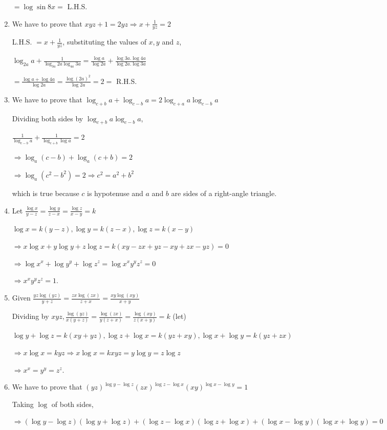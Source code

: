 \begin{enumerate}
  $= \log\sin8x =$ L.H.S.
\item We have to prove that $xyz + 1 = 2yz \Rightarrow x + \frac{1}{yz} = 2$

  L.H.S. $= x + \frac{1}{yz}$, substituting the values of $x, y$ and $z$,

  $\log_{2a}a + \frac{1}{\log_{3a}2a\log_{4a}3a} = \frac{\log a}{\log 2a} + \frac{\log 3a.\log 4a}{\log 2a.\log 3a}$

  $= \frac{\log a + \log 4a}{\log 2a} = \frac{\log(2a)^2}{\log 2a} = 2 =$ R.H.S.
\item We have to prove that $\log_{c + b}a + \log_{c - b}a = 2\log_{c + a}a\log_{c - b}a$

  Dividing both sides by $\log_{c + b}a\log_{c - b}a$,

  $\frac{1}{\log_{c - b}a} + \frac{1}{\log_{c + b}\log a} = 2$

  $\Rightarrow \log_a(c - b) + \log_a(c + b) = 2$

  $\Rightarrow \log_a(c^2 - b^2) = 2\Rightarrow c^2 = a^2 + b^2$

  which is true because $c$ is hypotenuse and $a$ and $b$ are sides of a right-angle triangle.
\item Let $\frac{\log x}{y - z} = \frac{\log y}{z - x} = \frac{\log z}{x - y} = k$

  $\log x = k(y - z), \log y = k(z - x), \log z = k(x - y)$

  $\Rightarrow x\log x + y\log y + z\log z = k(xy - zx + yz - xy + zx - yz) = 0$

  $\Rightarrow \log x^x + \log y^y + \log z^z = \log x^xy^yz^z = 0$

  $\Rightarrow x^xy^yz^z = 1$.
\item Given $\frac{yz\log(yz)}{y + z} = \frac{zx\log(zx)}{z + x} = \frac{xy\log(xy)}{x + y}$

  Dividing by $xyz, \frac{\log(yz)}{x(y + z)} = \frac{\log(zx)}{y(z + x)} = \frac{\log(xy)}{z(x + y)} = k$ (let)

  $\log y + \log z = k(xy + yz), \log z + \log x = k(yz + xy), \log x + \log y = k(yz + zx)$

  $\Rightarrow x\log x = kyz \Rightarrow x\log x = kxyz = y\log y = z\log z$

  $\Rightarrow x^x = y^y = z^z$.
\item We have to prove that $(yz)^{\log y - \log z}(zx)^{\log z - \log x}(xy)^{\log x - \log y} = 1$

  Taking $\log$ of both sides,

  $\Rightarrow (\log y - \log z)(\log y + \log z) + (\log z - \log x)(\log z + \log x) + (\log x - \log y)(\log x + \log y) = 0$


\end{enumerate}
